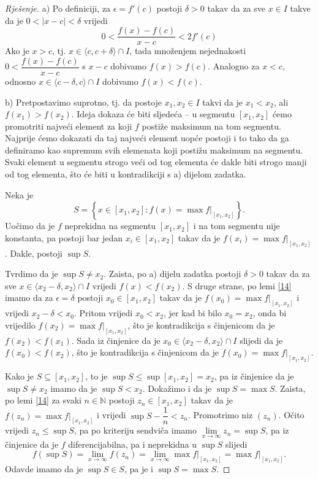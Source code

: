 \begin{proof}[Rješenje]
a) Po definiciji, za $\epsilon=f'(c)$ postoji $\delta>0$ takav da za sve $x\in I$ takve da je $0<|x-c|<\delta$ vrijedi
$$0<\dfrac{f(x)-f(c)}{x-c}<2f'(c)$$
Ako je $x>c$, tj. $x\in \langle c,c+\delta\rangle\cap I$, tada množenjem nejednakosti $0<\dfrac{f(x)-f(c)}{x-c}$ s $x-c$ dobivamo $f(x)>f(c)$. Analogno za $x<c$, odnosno $x\in \langle c-\delta, c\rangle\cap I$ dobivamo $f(x)<f(c)$.

b) Pretpostavimo suprotno, tj. da postoje $x_1, x_2\in I$ takvi da je $x_1<x_2$, ali $f(x_1)>f(x_2)$. Ideja dokaza će biti sljedeća -- u segmentu $[x_1, x_2]$ ćemo promotriti najveći element za koji $f$ postiže maksimum na tom segmentu. Najprije ćemo dokazati da taj najveći element uopće postoji i to tako da ga definiramo kao supremum svih elemenata koji postižu maksimum na segmentu. Svaki element u segmentu strogo veći od tog elementa će dakle biti strogo manji od tog elementa, što će biti u kontradikciji s a) dijelom zadatka.

Neka je 
$$S=\left\{x\in [x_1, x_2] : f(x)=\max{f|_{[x_1, x_2]}}\right\}.$$ 
Uočimo da je $f$ neprekidna na segmentu $[x_1, x_2]$ i na tom segmentu nije konstanta, pa postoji bar jedan $x_i\in [x_1, x_2]$ takav da je $f(x_i)=\max{f|_{[x_1, x_2]}}$. Dakle, postoji $\sup{S}$.

Tvrdimo da je $\sup{S}\neq x_2$. Zaista, po a) dijelu zadatka postoji $\delta>0$ takav da za sve $x\in \langle x_2-\delta, x_2\rangle\cap I$ vrijedi $f(x)<f(x_2)$. S druge strane, po lemi \ref{14} imamo da za $\epsilon=\delta$ postoji $x_0\in [x_1, x_2]$ takav da je $f(x_0)=\max{f|_{[x_1, x_2]}}$ i vrijedi $x_2-\delta<x_0$. Pritom vrijedi $x_0<x_2$, jer kad bi bilo $x_0=x_2$, onda bi vrijedilo $f(x_2)=\max{f|_{[x_1, x_2]}}$, što je kontradikcija s činjenicom da je $f(x_2)<f(x_1)$. Sada iz činjenice da je $x_0\in \langle x_2-\delta, x_2\rangle\cap I$ slijedi da je $f(x_0)<f(x_2)$, što je kontradikcija s činjenicom da je $f(x_0)=\max{f|_{[x_1, x_2]}}$.

Kako je $S\subseteq [x_1, x_2]$, to je $\sup{S}\leq \sup{[x_1, x_2]}=x_2$, pa iz činjenice da je $\sup{S}\neq x_2$ imamo da je $\sup{S}<x_2$. Dokažimo i da je
$\sup{S}=\max{S}.$
Zaista, po lemi \ref{14} za svaki $n\in \mathbb{N}$ postoji $z_n\in [x_1, x_2]$ takav da je $f(z_n)=\max{f|_{[x_1, x_2]}}$ i vrijedi $\sup{S}-\dfrac{1}{n}<z_n$. Promotrimo niz $(z_n)$. Očito vrijedi $z_n\leq \sup{S}$, pa po kriteriju sendviča imamo $\lim\limits_{x\to\infty}{z_n}=\sup{S}$, pa iz činjenice da je $f$ diferencijabilna, pa i neprekidna u $\sup{S}$ slijedi
$$f(\sup{S})=\lim\limits_{x\to\infty}{f(z_n)}=\lim\limits_{x\to\infty}{\max{f|_{[x_1, x_2]}}}=\max{f|_{[x_1, x_2]}}.$$
Odavde imamo da je $\sup{S}\in S$, pa je i $\sup{S}=\max{S}$.


\end{proof}
